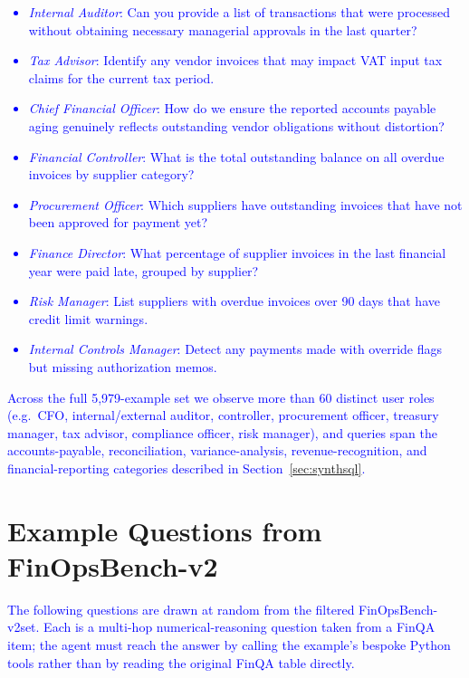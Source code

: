 \documentclass[11pt]{article}
\newcommand{\edit}[1]{\textcolor{blue}{#1}}
\newcommand{\groundedfinqa}{FinOpsBench-v2}\xspace
\begin{document}
\edit{\begin{itemize}
    \item \edit{\emph{Internal Auditor}}: Can you provide a list of transactions that were processed without obtaining necessary managerial approvals in the last quarter?
    \item \edit{\emph{Tax Advisor}}: Identify any vendor invoices that may impact VAT input tax claims for the current tax period.
    \item \edit{\emph{Chief Financial Officer}}: How do we ensure the reported accounts payable aging genuinely reflects outstanding vendor obligations without distortion?
    \item \edit{\emph{Financial Controller}}: What is the total outstanding balance on all overdue invoices by supplier category?
    \item \edit{\emph{Procurement Officer}}: Which suppliers have outstanding invoices that have not been approved for payment yet?
    \item \edit{\emph{Finance Director}}: What percentage of supplier invoices in the last financial year were paid late, grouped by supplier?
    \item \edit{\emph{Risk Manager}}: List suppliers with overdue invoices over 90 days that have credit limit warnings.
    \item \edit{\emph{Internal Controls Manager}}: Detect any payments made with override flags but missing authorization memos.
\end{itemize}}

\edit{Across the full 5{,}979-example set we observe more than 60 distinct user roles (e.g.\ CFO, internal/external auditor, controller, procurement officer, treasury manager, tax advisor, compliance officer, risk manager), and queries span the accounts-payable, reconciliation, variance-analysis, revenue-recognition, and financial-reporting categories described in Section~\ref{sec:synthsql}.}

\section{Example Questions from \groundedfinqa}
\label{app:example_queries_v2}

\edit{The following questions are drawn at random from the filtered \groundedfinqa set. Each is a multi-hop numerical-reasoning question taken from a FinQA item; the agent must reach the answer by calling the example's bespoke Python tools rather than by reading the original FinQA table directly.}
\end{document}
